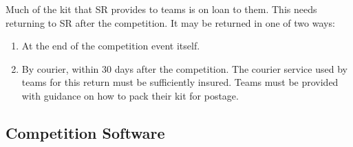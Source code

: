 Much of the kit that SR provides to teams is on loan to them.  This needs returning to SR after the competition.  It may be returned in one of two ways:

\begin{enumerate}
\item At the end of the competition event itself.
\item By courier, within 30 days after the competition.  The courier service used by teams for this return must be sufficiently insured.  Teams must be provided with guidance on how to pack their kit for postage.
\end{enumerate}

\subsection{Competition Software}

